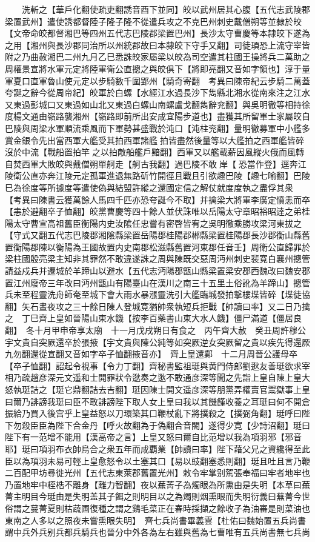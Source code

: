 　　洗斬之【華戶化翻使疏吏翻誘音酉下並同】皎以武州居其心腹【五代志武陵郡梁置武州】遣使誘都督陸子隆子隆不從遣兵攻之不克巴州刺史戴僧朔等並隸於皎【文帝命皎都督湘巴等四州五代志巴陵郡梁置巴州】長沙太守曹慶等本隸皎下遂為之用【湘州與長沙郡同治所以州統郡故曰本隸皎下守手又翻】司徒頊恐上流守宰皆附之乃曲赦湘巴二州九月乙巳悉誅皎家屬梁以皎為司空遣其柱國王操將兵二萬助之周權景宣將水軍元定將陸軍衛公直摠之與皎俱下【將即亮翻又音如字領也】淳于量軍夏口直軍魯山使元定以步騎數千圍郢州【騎奇寄翻　考異曰陳帝紀云步騎二萬蓋夸誕之辭今從周帝紀】皎軍於白螺【水經江水過長沙下雋縣北湘水從南來注之江水又東過彭城口又東過如山北又東過白螺山南螺盧戈翻雋辭兖翻】與吳明徹等相持徐度楊文通由嶺路襲湘州【嶺路即前所出安成宜陽步道也】盡獲其所留軍士家屬皎自巴陵與周梁水軍順流乘風而下軍勢甚盛戰於沌口【沌柱兖翻】量明徹募軍中小艦多賞金銀令先出當西軍大艦受其拍西軍諸艦拍皆盡然後量等以大艦拍之西軍艦皆碎沒於中流【戰船置拍竿之以拍敵船艦戶黯翻】西軍又以艦載薪因風縱火俄而風轉自焚西軍大敗皎與戴僧朔單舸走【舸古我翻】過巴陵不敢岸【恐當作登】逕奔江陵衛公直亦奔江陵元定孤軍進退無路斫竹開徑且戰且引欲趣巴陵【趣七喻翻】巴陵巳為徐度等所據度等遣使偽與結盟許縱之還國定信之解仗就度度執之盡俘其衆　【考異曰陳書云獲萬餘人馬四千匹亦恐夸誕今不取】并擒梁大將軍李廣定憤恚而卒【恚於避翻卒子恤翻】皎黨曹慶等四十餘人並伏誅唯以岳陽太守章昭裕昭逹之弟桂陽太守曹宣高祖舊臣衡陽内史汝隂任忠嘗有密啓皆宥之吳明徹乘勝攻梁河東拔之【守式又翻五代志巴陵郡湘隂縣梁置岳陽郡桂陽郡郴縣梁置桂陽郡長沙郡衡山縣舊置衡陽郡陳以衡陽為王國故置内史南郡松滋縣舊置河東郡任音壬】周衛公直歸罪於梁柱國殷亮梁主知非其罪然不敢違遂誅之周與陳既交惡周沔州刺史裴寛白襄州摠管請益戍兵并遷城於羊蹄山以避水【五代志沔陽郡甑山縣梁置梁安郡西魏改曰魏安郡置江州廢帝三年改曰沔州甑山有陽臺山在漢川之南三十五里土俗訛為羊蹄山】摠管兵未至程靈洗舟師奄至城下會大雨水暴漲靈洗引大艦臨城發拍撃樓堞皆碎【堞徒協翻】矢石晝夜攻之三十餘日陳人登城寛猶帥衆執短兵拒戰【帥讀曰率】又二日乃擒之　丁巳齊上皇如晉陽山東水饑【按李百藥書山東大水人饑】僵尸滿道【僵居良翻】　冬十月甲申帝享太廟　十一月戊戌朔日有食之　丙午齊大赦　癸丑周許穆公宇文貴自突厥還卒於張掖【宇文貴與陳公純等如突厥逆女突厥留之貴以疾先得還厥九勿翻還從宣翻又音如字卒子恤翻掖音亦】　齊上皇還鄴　十二月周晉公護母卒【卒子恤翻】詔起令視事【令力丁翻】齊秘書監祖珽與黄門侍郎劉逖友善珽欲求宰相乃疏趙彦深元文遥和士開罪狀令逖奏之逖不敢通彦深等聞之先詣上皇自陳上皇大怒執珽詰之【珽它鼎翻詰去吉翻】珽因陳士開文遥彦深等朋黨弄權賣官鬻獄事上皇曰爾乃誹謗我珽曰臣不敢誹謗陛下取人女上皇曰我以其饑饉收養之耳珽曰何不開倉振給乃買入後宫乎上皇益怒以刀環築其口鞭杖亂下將撲殺之【撲弼角翻】珽呼曰陛下勿殺臣臣為陛下合金丹【呼火故翻為于偽翻合音閤】遂得少寛【少詩沼翻】珽曰陛下有一范增不能用【漢高帝之言】上皇又怒曰爾自比范增以我為項羽邪【邪音耶】珽曰項羽布衣帥烏合之衆五年而成覇業【帥讀曰率】陛下藉父兄之資纔得至此臣以為項羽未易可輕上皇愈怒令以土塞其口【易以豉翻塞悉則翻】珽且吐且言乃鞭二百配甲坊尋徙光州【五代志東萊郡舊置光州】敕令牢掌别駕張奉福曰牢者地牢也乃置地牢中桎梏不離身【離力智翻】夜以蕪菁子為燭眼為所熏由是失明【本草曰蕪菁主明目今珽由是失明盖其子餌之則明目以之為燭則烟熏眼而失明衍義曰蕪菁今世俗謂之蔓菁夏則枯蔬圃復種之謂之鷄毛菜正在春時採擷之餘收子為油審是則菜油也東南之人多以之照夜未嘗熏眼失明】　齊七兵尚書畢義雲【杜佑曰魏始置五兵尚書謂中兵外兵别兵都兵騎兵也晉分中外各為左右雖與舊為七曹唯有五兵尚書無七兵尚